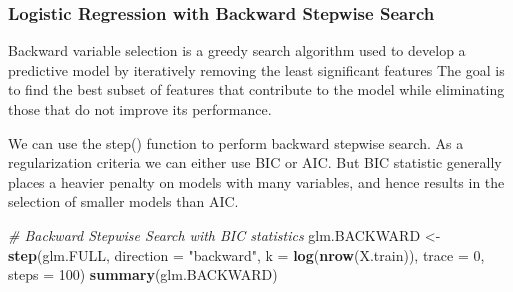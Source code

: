 \documentclass[
  10pt,
  paper=a4,
  ,captions=tableheading
]{scrartcl}
\newenvironment{Shaded}{\begin{snugshade}}{\end{snugshade}}
\newcommand{\AttributeTok}[1]{\textcolor[rgb]{0.13,0.29,0.53}{#1}}
\newcommand{\CommentTok}[1]{\textcolor[rgb]{0.56,0.35,0.01}{\textit{#1}}}
\newcommand{\DecValTok}[1]{\textcolor[rgb]{0.00,0.00,0.81}{#1}}
\newcommand{\FunctionTok}[1]{\textcolor[rgb]{0.13,0.29,0.53}{\textbf{#1}}}
\newcommand{\NormalTok}[1]{#1}
\newcommand{\OtherTok}[1]{\textcolor[rgb]{0.56,0.35,0.01}{#1}}
\newcommand{\StringTok}[1]{\textcolor[rgb]{0.31,0.60,0.02}{#1}}
\begin{document}
\subsubsection{Logistic Regression with Backward Stepwise
Search}\label{logistic-regression-with-backward-stepwise-search}

Backward variable selection is a greedy search algorithm used to develop
a predictive model by iteratively removing the least significant
features The goal is to find the best subset of features that contribute
to the model while eliminating those that do not improve its
performance.

We can use the step() function to perform backward stepwise search. As a
regularization criteria we can either use BIC or AIC. But BIC statistic
generally places a heavier penalty on models with many variables, and
hence results in the selection of smaller models than AIC.

\small

\begin{Shaded}
\begin{Highlighting}[]
\CommentTok{\# Backward Stepwise Search with BIC statistics}
\NormalTok{glm.BACKWARD }\OtherTok{\textless{}{-}} \FunctionTok{step}\NormalTok{(glm.FULL, }\AttributeTok{direction =} \StringTok{"backward"}\NormalTok{, }\AttributeTok{k =} \FunctionTok{log}\NormalTok{(}\FunctionTok{nrow}\NormalTok{(X.train)),}
    \AttributeTok{trace =} \DecValTok{0}\NormalTok{, }\AttributeTok{steps =} \DecValTok{100}\NormalTok{)}
\FunctionTok{summary}\NormalTok{(glm.BACKWARD)}
\end{Highlighting}
\end{Shaded}
\end{document}
